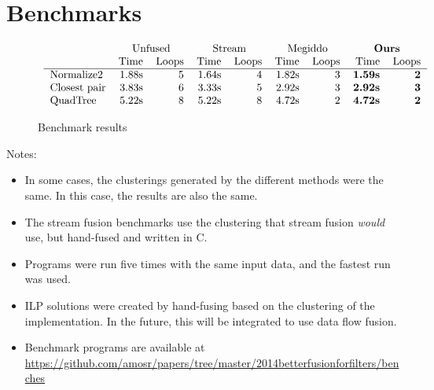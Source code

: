\section{Benchmarks}
\label{s:Benchmarks}

\begin{figure*}
$$\begin{array}{c}

\begin{tabular}{lrrrrrrrr}
                &   \multicolumn{2}{c}{Unfused}         & \multicolumn{2}{c}{Stream}
                & \multicolumn{2}{c}{Megiddo} &\multicolumn{2}{c}{\textbf{Ours}} \\
                & Time & Loops   & Time & Loops      & Time & Loops & Time & Loops   \\
\hline
Normalize2      & 1.88s & 5      & 1.64s & 4          & 1.82s & 3  & \textbf{1.59s} & \textbf{2}\\
Closest pair    & 3.83s & 6      & 3.33s & 5          & 2.92s & 3  & \textbf{2.92s} & \textbf{3}\\
QuadTree        & 5.22s & 8      & 5.22s & 8          & 4.72s & 2  & \textbf{4.72s} & \textbf{2}\\
\end{tabular}

\end{array}$$
\caption{Benchmark results}
\label{f:BenchResults}
\end{figure*}

Notes:
\begin{itemize}
\item
In some cases, the clusterings generated by the different methods were the same. In this case, the results are also the same. 
\item
The stream fusion benchmarks use the clustering that stream fusion \emph{would} use, but hand-fused and written in C.
\item
Programs were run five times with the same input data, and the fastest run was used.
\item
ILP solutions were created by hand-fusing based on the clustering of the implementation. In the future, this will be integrated to use data flow fusion.
\item
Benchmark programs are available at \url{https://github.com/amosr/papers/tree/master/2014betterfusionforfilters/benches}
\end{itemize}

